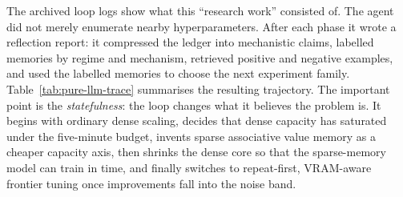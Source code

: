 The archived loop logs show what this ``research work'' consisted of. The agent did not merely enumerate nearby hyperparameters. After each phase it wrote a reflection report: it compressed the ledger into mechanistic claims, labelled memories by regime and mechanism, retrieved positive and negative examples, and used the labelled memories to choose the next experiment family. Table~\ref{tab:pure-llm-trace} summarises the resulting trajectory. The important point is the \emph{statefulness}: the loop changes what it believes the problem is. It begins with ordinary dense scaling, decides that dense capacity has saturated under the five-minute budget, invents sparse associative value memory as a cheaper capacity axis, then shrinks the dense core so that the sparse-memory model can train in time, and finally switches to repeat-first, VRAM-aware frontier tuning once improvements fall into the noise band.

